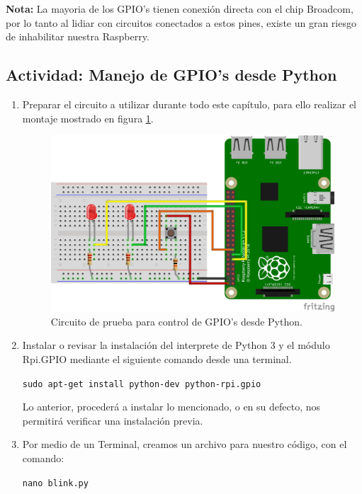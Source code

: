 \documentclass[letterpaper, 10pt]{report}
\begin{document}
\textbf{Nota:} La mayoria de los GPIO's tienen conexión directa con el chip Broadcom, por lo tanto al lidiar con circuitos conectados a estos pines, existe un gran riesgo de inhabilitar nuestra Raspberry.

\subsection{Actividad: Manejo de GPIO's desde Python}
\begin{enumerate}
	\item Preparar el circuito a utilizar durante todo este capítulo, para ello realizar el montaje mostrado en figura \ref{testPi}.
	
	\begin{figure}[h!]
	\centering
	\includegraphics[scale=0.8]{testPi.png}
	\caption{Circuito de prueba para control de GPIO's desde Python. \label{testPi}}
\end{figure}
	
	\item Instalar o revisar la instalación del interprete de Python 3 y el módulo Rpi.GPIO mediante el siguiente comando desde una terminal.
	
	\begin{center}
	\texttt{sudo apt-get install python-dev python-rpi.gpio}
	\end{center}
	
	Lo anterior, procederá a instalar lo mencionado, o en su defecto, nos permitirá verificar una instalación previa.
	
	\item Por medio de un Terminal, creamos un archivo para nuestro código, con el comando:\\
	\begin{center}	
	\texttt{nano blink.py}
	\end{center}
	

\end{enumerate}
\end{document}
